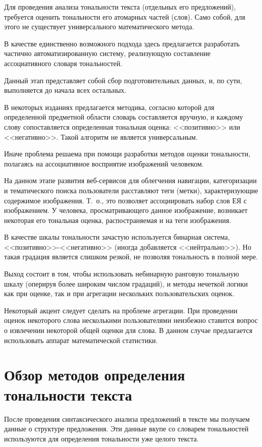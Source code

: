 \documentclass[a4paper,14pt,russian]{extreport}
\begin{document}
Для проведения анализа тональности текста (отдельных его предложений), требуется оценить тональности его атомарных частей (слов). Само собой, для этого не существует универсального математического метода.

В качестве единственно возможного подхода здесь предлагается разработать частично автоматизированную систему, реализующую составление ассоциативного словаря тональностей.

Данный этап представляет собой сбор подготовительных данных, и, по сути, выполняется до начала всех остальных.

В некоторых изданиях предлагается методика, согласно которой для определенной предметной области словарь составляется вручную, и каждому слову сопоставляется определенная тональная оценка: <<позитивно>> или <<негативно>>. Такой алгоритм не является универсальным.

Иначе проблема решаема при помощи разработки методов оценки тональности, полагаясь на ассоциативное восприятие изображений человеком.

На данном этапе развития веб-сервисов для облегчения навигации, категоризации и тематического поиска пользователи расставляют теги (метки), характеризующие содержимое изображения. Т.~о., это позволяет ассоциировать набор слов ЕЯ с изображением. У человека, просматривающего данное изображение, возникает некоторая его тональная оценка, распостраняемая и на теги изображения.

В качестве шкалы тональности зачастую используется бинарная система, <<позитивно>>-<<негативно>> (иногда добавляется <<нейтрально>>). Но такая градация является слишком резкой, не позволяя тональность в полной мере.

Выход состоит в том, чтобы использовать небинарную ранговую тональную шкалу (оперируя более широким числом градаций), и методы нечеткой логики как при оценке, так и при агрегации нескольких пользовательских оценок.

Некоторый акцент следует сделать на проблеме агрегации. При проведении оценок некоторого слова несколькими пользователями неизбежно ставится вопрос о извлечении некоторой общей оценки для слова. В данном случае предлагается использовать аппарат математической статистики.
\section{Обзор методов определения тональности текста}

После проведения синтаксического анализа предложений в тексте мы получаем данные о структуре предложения. Эти данные вкупе со словарем тональностей используются для определения тональности уже целого текста.
\end{document}
